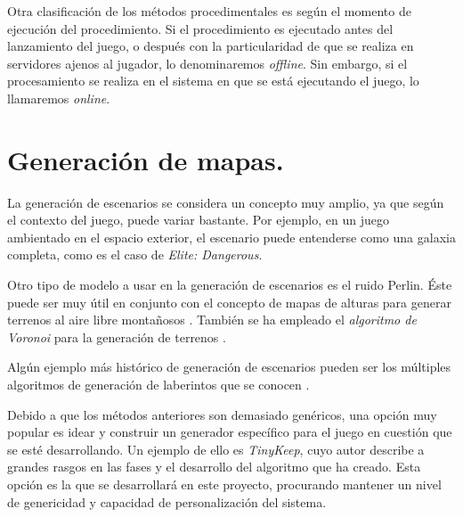 Otra clasificación de los métodos procedimentales es según el momento de ejecución del procedimiento. Si el procedimiento es ejecutado antes del lanzamiento del juego, o después con la particularidad de que se realiza en servidores ajenos al jugador, lo denominaremos \emph{offline}. Sin embargo, si el procesamiento se realiza en el sistema en que se está ejecutando el juego, lo llamaremos \emph{online}.

\section{Generación de mapas.}

La generación de escenarios se considera un concepto muy amplio, ya que según el contexto del juego, puede variar bastante. Por ejemplo, en un juego ambientado en el espacio exterior, el escenario puede entenderse como una galaxia completa, como es el caso de \emph{Elite: Dangerous}.

Otro tipo de modelo a usar en la generación de escenarios es el ruido Perlin. Éste puede ser muy útil en conjunto con el concepto de mapas de alturas para generar terrenos al aire libre montañosos \cite{libnoise}. También se ha empleado el \emph{algoritmo de Voronoi} para la generación de terrenos \cite{amitvoronoi}.

Algún ejemplo más histórico de generación de escenarios pueden ser los múltiples algoritmos de generación de laberintos que se conocen \cite{labygen}.

Debido a que los métodos anteriores son demasiado genéricos, una opción muy popular es idear y construir un generador específico para el juego en cuestión que se esté desarrollando. Un ejemplo de ello es \emph{TinyKeep}, cuyo autor describe a grandes rasgos en \cite{tinykeep} las fases y el desarrollo del algoritmo que ha creado. Esta opción es la que se desarrollará en este proyecto, procurando mantener un nivel de genericidad y capacidad de personalización del sistema.



